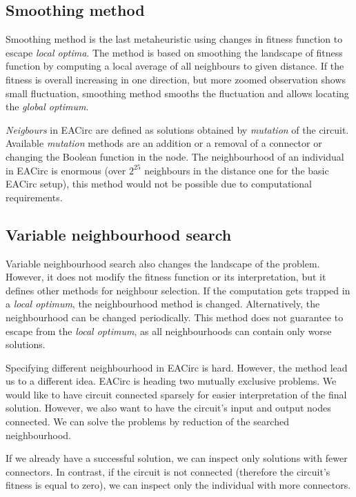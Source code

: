 \documentclass[
  print, %
  Table,   %
  nolof,     %
  nolot,     %
  11pt, %
  oneside  %
]{fithesis3}
\begin{document}
\subsection{Smoothing method}
\label{subsec:opt-single-sol-smooth}

Smoothing method is the last metaheuristic using changes in fitness function to escape \textit{local optima}. The method is based on smoothing the landscape of fitness function by computing a local average of all neighbours to given distance. If the fitness is overall increasing in one direction, but more zoomed observation shows small fluctuation, smoothing method smooths the fluctuation and allows locating the \textit{global optimum}.

\textit{Neigbours} in EACirc are defined as solutions obtained by \textit{mutation} of the circuit. Available \textit{mutation} methods are an addition or a removal of a connector or changing the Boolean function in the node. The neighbourhood of an individual in EACirc is enormous (over $2^{25}$ neighbours in the distance one for the basic EACirc setup), this method would not be possible due to computational requirements.

\subsection{Variable neighbourhood search}
\label{subsec:opt-single-sol-vns}

Variable neighbourhood search also changes the landscape of the problem. However, it does not modify the fitness function or its interpretation, but it defines other methods for neighbour selection. If the computation gets trapped in a \textit{local optimum}, the neighbourhood method is changed. Alternatively, the neighbourhood can be changed periodically. This method does not guarantee to escape from the \textit{local optimum}, as all neighbourhoods can contain only worse solutions.

Specifying different neighbourhood in EACirc is hard. However, the method lead us to a different idea. EACirc is heading two mutually exclusive problems. We would like to have circuit connected sparsely for easier interpretation of the final solution. However, we also want to have the circuit's input and output nodes connected. We can solve the problems by reduction of the searched neighbourhood.

If we already have a successful solution, we can inspect only solutions with fewer connectors. In contrast, if the circuit is not connected (therefore the circuit's fitness is equal to zero), we can inspect only the individual with more connectors.
\end{document}
